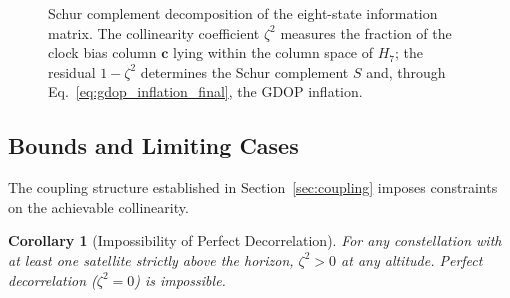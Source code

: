 \documentclass[letterpaper,times]{IONconf-v2}
\theoremstyle{plain}
\newtheorem{corollary}{Corollary}
\theoremstyle{remark}
\begin{document}
\begin{figure}[htb]
{
}%
\caption{Schur complement decomposition of the eight-state information matrix. The collinearity coefficient $\zeta^2$ measures the fraction of the clock bias column $\mathbf{c}$ lying within the column space of $H_7$; the residual $1-\zeta^2$ determines the Schur complement $S$ and, through Eq.~\eqref{eq:gdop_inflation_final}, the GDOP inflation.}
\label{fig:schur_flow}
\end{figure}

\vspace{-10pt}

\subsection{Bounds and Limiting Cases}\label{subsec:bounds}

The coupling structure established in Section~\ref{sec:coupling} imposes constraints on the achievable collinearity.

\begin{corollary}[Impossibility of Perfect Decorrelation]\label{cor:high_collinearity}
For any constellation with at least one satellite strictly above the horizon, $\zeta^2 > 0$ at any altitude. Perfect decorrelation ($\zeta^2 = 0$) is impossible.
\end{corollary}
\end{document}
